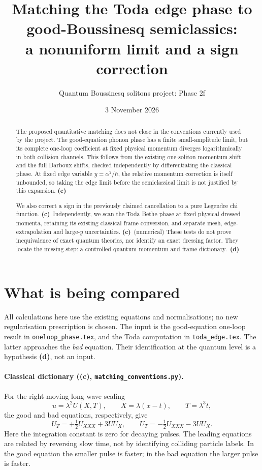 \documentclass[11pt,a4paper]{article}
\title{Matching the Toda edge phase to good-Boussinesq semiclassics:\\a nonuniform limit and a sign correction}
\author{Quantum Boussinesq solitons project: Phase 2f}
\date{3 November 2026}
\newcommand{\Lc}{\textsf{\textbf{(c)}}}
\newcommand{\Ld}{\textsf{\textbf{(d)}}}
\newcommand{\scr}[1]{\texttt{matching\_#1.py}}
\begin{document}
\maketitle
\begin{abstract}
The proposed quantitative matching does not close in the conventions currently
used by the project. The good-equation phonon phase has a finite small-amplitude
limit, but its complete one-loop coefficient at fixed physical momentum diverges
logarithmically in both collision channels. This follows from the existing
one-soliton momentum shift and the full Darboux shifts, checked independently by
differentiating the classical phase. At fixed edge variable $y=\alpha^2/\hbar$,
the relative momentum correction is itself unbounded, so taking the edge limit
before the semiclassical limit is not justified by this expansion. \Lc

We also correct a sign in the previously claimed cancellation to a pure
Legendre chi function. \Lc\ Independently, we scan the Toda Bethe phase at fixed
physical dressed momenta, retaining its existing classical frame conversion,
and separate mesh, edge-extrapolation and large-$y$ uncertainties. \Lc\ (numerical)
These tests
do not prove inequivalence of exact quantum theories, nor identify an exact
dressing factor. They locate the missing step: a controlled quantum momentum
and frame dictionary.~\Ld
\end{abstract}

\section{What is being compared}
All calculations here use the existing equations and normalisations; no new
regularisation prescription is chosen. The input is the good-equation
one-loop result in \texttt{oneloop\_phase.tex}, and the Toda computation in
\texttt{toda\_edge.tex}. The latter approaches the \emph{bad} equation.
Their identification at the quantum level is a hypothesis \Ld, not an input.

\paragraph{Classical dictionary (\Lc, \scr{conventions}).}
For the right-moving long-wave scaling
\[
 u=\lambda^2 U(X,T),\qquad X=\lambda(x-t),\qquad T=\lambda^3t,
\]
the good and bad equations, respectively, give
\[
 U_T=+\tfrac12 U_{XXX}+3UU_X,
 \qquad U_T=-\tfrac12 U_{XXX}-3UU_X.
\]
Here the integration constant is zero for decaying pulses. The leading
equations are related by reversing slow time, not by identifying colliding
particle labels. In the good equation the smaller pulse is faster; in the bad
equation the larger pulse is faster.
\end{document}
